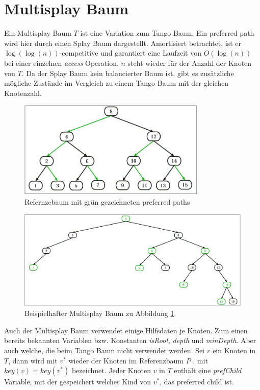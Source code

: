 \documentclass[a4paper,12pt]{article}
\begin{document}
\section{Multisplay Baum}
Ein Multisplay Baum \cite{multisplay} $T$ ist eine Variation zum Tango Baum. Ein preferred path wird hier durch einen Splay Baum dargestellt. Amortisiert betrachtet, ist er $\log\left(\log\left(n\right)\right)$-competitive und garantiert eine Laufzeit von $O\left(\log \left(n\right)\right)$ bei einer einzelnen {\textit{access}} Operation. $n$ steht wieder für der Anzahl der Knoten von $T$. Da der Splay Baum kein balancierter Baum ist, gibt es zusätzliche mögliche Zustände im Vergleich zu einem Tango Baum mit der gleichen Knotenzahl.
\begin{figure}[h]
	\centering
	\includegraphics[width= 0.8\textwidth]{"Medien/Multisplay/referenzTree"}
	\caption {Refernzebaum mit grün gezeichneten preferred paths }
	\label{fig:referenzTree}
\end{figure} 
\begin{figure}[h]
	\centering
	\includegraphics[width= 1\textwidth]{"Medien/Multisplay/pfadRepresentation"}
	\caption {Beispielhafter Multisplay Baum zu Abbildung \ref{fig:referenzTree}.}
	\label{fig:pfadRepresentation}
\end{figure} 
Auch der Multisplay Baum verwendet einige Hilfsdaten je Knoten. Zum einen bereits bekannten Variablen bzw. Konstanten \textit{isRoot}, \textit{depth} und \textit{minDepth}. Aber auch welche, die beim Tango Baum nicht verwendet werden. Sei $v$ ein Knoten in $T$, dann wird mit $v^*$  wieder der Knoten im Referenzbaum $P$ ,  mit $\mathit{key}\left(v\right) = \mathit{key}\left(v^*\right)$ bezeichnet. Jeder Knoten $v$ in $T$ enthält eine \textit{prefChild} Variable, mit der gespeichert welches Kind von $v^*$, das preferred child ist. 
\end{document}

